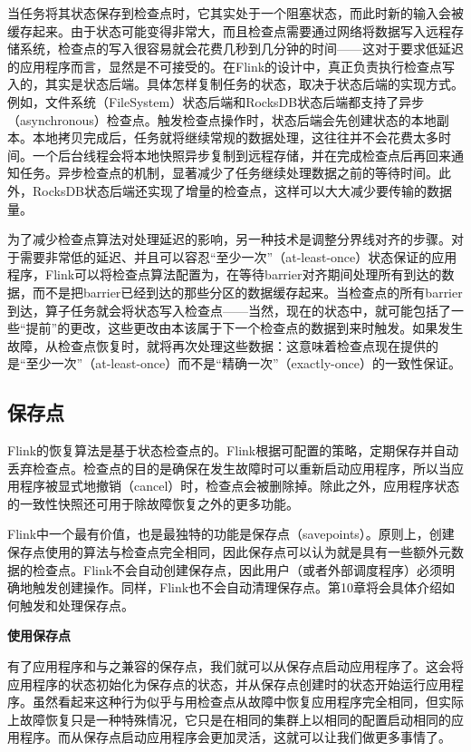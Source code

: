 \documentclass[cn,11pt,chinese]{elegantbook}
\begin{document}
当任务将其状态保存到检查点时，它其实处于一个阻塞状态，而此时新的输入会被缓存起来。由于状态可能变得非常大，而且检查点需要通过网络将数据写入远程存储系统，检查点的写入很容易就会花费几秒到几分钟的时间——这对于要求低延迟的应用程序而言，显然是不可接受的。在Flink的设计中，真正负责执行检查点写入的，其实是状态后端。具体怎样复制任务的状态，取决于状态后端的实现方式。例如，文件系统（FileSystem）状态后端和RocksDB状态后端都支持了异步（asynchronous）检查点。触发检查点操作时，状态后端会先创建状态的本地副本。本地拷贝完成后，任务就将继续常规的数据处理，这往往并不会花费太多时间。一个后台线程会将本地快照异步复制到远程存储，并在完成检查点后再回来通知任务。异步检查点的机制，显著减少了任务继续处理数据之前的等待时间。此外，RocksDB状态后端还实现了增量的检查点，这样可以大大减少要传输的数据量。

为了减少检查点算法对处理延迟的影响，另一种技术是调整分界线对齐的步骤。对于需要非常低的延迟、并且可以容忍“至少一次”（at-least-once）状态保证的应用程序，Flink可以将检查点算法配置为，在等待barrier对齐期间处理所有到达的数据，而不是把barrier已经到达的那些分区的数据缓存起来。当检查点的所有barrier到达，算子任务就会将状态写入检查点——当然，现在的状态中，就可能包括了一些“提前”的更改，这些更改由本该属于下一个检查点的数据到来时触发。如果发生故障，从检查点恢复时，就将再次处理这些数据：这意味着检查点现在提供的是“至少一次”（at-least-once）而不是“精确一次”（exactly-once）的一致性保证。

\subsection{保存点}

Flink的恢复算法是基于状态检查点的。Flink根据可配置的策略，定期保存并自动丢弃检查点。检查点的目的是确保在发生故障时可以重新启动应用程序，所以当应用程序被显式地撤销（cancel）时，检查点会被删除掉。除此之外，应用程序状态的一致性快照还可用于除故障恢复之外的更多功能。

Flink中一个最有价值，也是最独特的功能是保存点（savepoints）。原则上，创建保存点使用的算法与检查点完全相同，因此保存点可以认为就是具有一些额外元数据的检查点。Flink不会自动创建保存点，因此用户（或者外部调度程序）必须明确地触发创建操作。同样，Flink也不会自动清理保存点。第10章将会具体介绍如何触发和处理保存点。

\textbf{使用保存点}

有了应用程序和与之兼容的保存点，我们就可以从保存点启动应用程序了。这会将应用程序的状态初始化为保存点的状态，并从保存点创建时的状态开始运行应用程序。虽然看起来这种行为似乎与用检查点从故障中恢复应用程序完全相同，但实际上故障恢复只是一种特殊情况，它只是在相同的集群上以相同的配置启动相同的应用程序。而从保存点启动应用程序会更加灵活，这就可以让我们做更多事情了。
\end{document}

